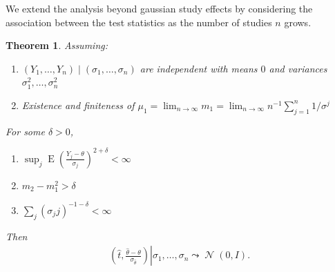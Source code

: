 \documentclass[12pt]{article}
\newtheorem{theorem}{Theorem}
\newcommand{\m}{m}
\newcommand{\s}{S}
\newcommand{\y}{Y}
\renewcommand{\t}{t}
\DeclareMathOperator{\E}{E}
\DeclareMathOperator{\N}{\mathcal{N}}
\begin{document}
We extend the analysis beyond gaussian study effects by considering
the association between the test statistics as the number of studies
$n$
grows. %


\begin{theorem}\label{thrm:egger asy} Assuming:
  \begin{enumerate}
  \item $(\y_1,\ldots,\y_n) \mid (\sigma_1,\ldots,\sigma_n)$ are independent with
    means $0$ and variances $\sigma_1^2,\ldots,\sigma_n^2$
  \item Existence and
    finiteness of $\mu_1=\lim_{n\to\infty}\m_1=\lim_{n\to\infty}n^{-1}\sum_{j=1}^n 1/\sigma^j$
  \end{enumerate}
  For some  $\delta>0$,
  \begin{enumerate}[resume]
  \item $\sup_j\E\left(\frac{\y_j-\theta}{\sigma_j}\right)^{2+\delta}<\infty$
  \item $\m_2-\m_1^2>\delta$
      \item $\sum_j\left(\sigma_j j\right)^{-1-\delta}<\infty$
  \end{enumerate}
  Then
  \begin{align}
    \left.\left(\hat\t,\frac{\hat\theta-\theta}{\sigma_{\hat\theta}}\right) \right| \sigma_1,\ldots,\sigma_n \leadsto \N(0,I).
  \end{align}
\end{theorem}
\end{document}
